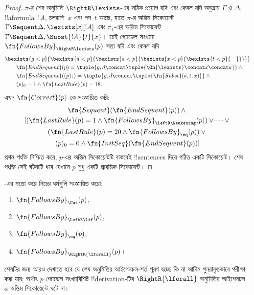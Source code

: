 \documentclass[../../../include/open-logic-section]{subfiles}
\begin{document}
\begin{proof}
$\pi$-র শেষ অনুমিতি $\RightR\lexists$-এর সঠিক প্রয়োগ যদি এবং কেবল যদি
অনুক্রম $\Gamma$ ও $\Delta$, !!a{formula}~$!A$, চলরাশি~$x$ এবং পদ~$t$ আছে,
যাতে $\pi$-র অন্তিম সিকোয়েন্ট $\Gamma \Sequent \Delta, \lexists[x][!A]$
এবং $\pi_1$-এর অন্তিম সিকোয়েন্ট $\Gamma \Sequent \Delta,
\Subst{!A}{t}{x}$। তাই গ্যোডেল সংখ্যায় $\fn{FollowsBy}_{\RightR\lexists}(p)$
সত্য যদি এবং কেবল যদি
\begin{align*}
  & \bexists{g<p}{\bexists{d<p}{\bexists{a<p}{\bexists{x<p}{\bexists{t<p}{\quad}}}}}\\
  & \qquad \fn{EndSequent}(p) =
  \tuple{
    g,
    d \concat \tuple{\Gn{\lexists} \concat x \concat a}
  } \land {}\\
  & \qquad \fn{EndSequent}((p)_1) =
  \tuple{
    g,
    d \concat \tuple{\fn{Subst}(a, t, x)}
  } \land {}\\
  & \qquad (p)_0 = 1 \land \fn{LastRule}(p) = 18.
\end{align*}
এখন $\fn{Correct}(p)$-কে সংজ্ঞায়িত করি:
\begin{multline*}
  \fn{Sequent}(\fn{EndSequent}(p)) \land {}\\
  [(\fn{LastRule}(p) = 1 \land
  \fn{FollowsBy}_{\LeftR\Weakening}(p)) \lor \dots \lor {}\\
  (\fn{LastRule}(p) = 20 \land \fn{FollowsBy}_{\eq}(p)) \lor {}\\
  (p)_0 = 0 \land \fn{InitSeq}(\fn{EndSequent}(p))]
\end{multline*}
প্রথম পংক্তি নিশ্চিত করে, $p$-এর অন্তিম সিকোয়েন্টটি বাস্তবেই
!!{sentence}s দিয়ে গঠিত একটি সিকোয়েন্ট। শেষ পংক্তি সেই ঘটনাটি ধরে যেখানে
$p$ শুধু একটি প্রারম্ভিক সিকোয়েন্ট।
\end{proof}

\begin{prob}
  -এর মতো করে নিচের ধর্মগুলি সংজ্ঞায়িত করো:
  \begin{enumerate}
  \item $\fn{FollowsBy}_{\Cut}(p)$,
  \item $\fn{FollowsBy}_{\LeftR\lif}(p)$,
  \item $\fn{FollowsBy}_{\eq}(p)$,
  \item $\fn{FollowsBy}_{\RightR{\lforall}}(p)$।
  \end{enumerate}
  শেষটির জন্য আরও দেখাতে হবে যে শেষ অনুমিতির আইগেনচল-শর্ত পূরণ হচ্ছে
  কি না আদিম পুনরাবৃত্তভাবে পরীক্ষা করা যায়; অর্থাৎ $p$ গ্যোডেল সংখ্যাবিশিষ্ট
  !!{derivation}-টির $\RightR{\lforall}$ অনুমিতির আইগেনচল~$a$ অন্তিম
  সিকোয়েন্টে ঘটে না।
  \end{prob}
\end{document}
